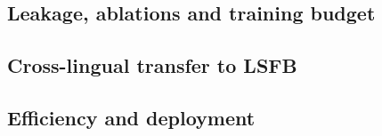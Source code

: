 \subsection{Leakage, ablations and training budget}
\label{sec:ablations}



\subsection{Cross-lingual transfer to LSFB}
\label{sec:transfer}



\subsection{Efficiency and deployment}
\label{sec:efficiency}

\begin{table}[t]
  \centering
  \caption{Model size and single-sign latency on an Apple M1 CPU (one thread) after export to
  ONNX. Native: ONNX Runtime; browser: ONNX Runtime Web (WebAssembly) in Chromium. INT8: dynamic
  quantisation of the weight matrices, with the input projection kept in FP32. Validation top-1
  on 2{,}000 ASL validation clips.}
  \label{tab:export}
  \small
  
\end{table}

